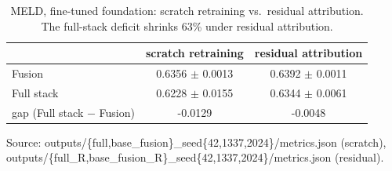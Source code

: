 \begin{table}[t]
\centering
\caption{MELD, fine-tuned foundation: scratch retraining vs.\ residual attribution. The full-stack deficit shrinks 63\% under residual attribution.}
\label{tab:scratch-vs-residual}
\begin{tabular}{lcc}
\toprule
 & scratch retraining & residual attribution \\
\midrule
Fusion & 0.6356 $\pm$ 0.0013 & 0.6392 $\pm$ 0.0011 \\
Full stack & 0.6228 $\pm$ 0.0155 & 0.6344 $\pm$ 0.0061 \\
gap (Full stack $-$ Fusion) & -0.0129 & -0.0048 \\
\bottomrule
\end{tabular}
\par\footnotesize Source: outputs/\{full,base\_fusion\}\_seed\{42,1337,2024\}/metrics.json (scratch), outputs/\{full\_R,base\_fusion\_R\}\_seed\{42,1337,2024\}/metrics.json (residual).
\end{table}
